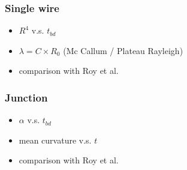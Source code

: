     \subsubsection{Single wire}
    \begin{itemize}
        \item $R^4$ v.s. $t_{bd}$
        \item $\lambda = C \times R_0$ (Mc Callum / Plateau Rayleigh)
        \item comparison with Roy et al.
    \end{itemize}
    \subsubsection{Junction}
    \begin{itemize}
        \item $\alpha$ v.s. $t_{bd}$
        \item mean curvature v.s. $t$
        \item comparison with Roy et al.
    \end{itemize}
